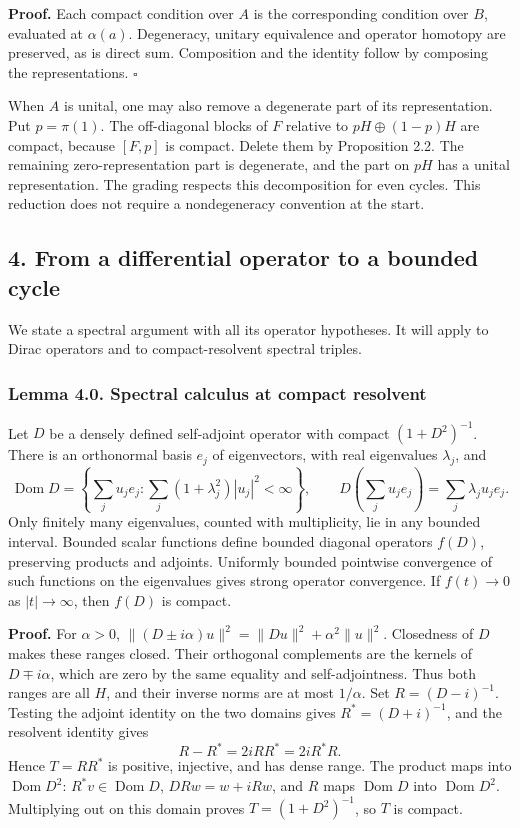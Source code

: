 \documentclass[
  11pt,
]{article}
\begin{document}
\textbf{Proof.} Each compact condition over \(A\) is the corresponding
condition over \(B\), evaluated at \(\alpha(a)\). Degeneracy, unitary
equivalence and operator homotopy are preserved, as is direct sum.
Composition and the identity follow by composing the representations.
\(\square\)

When \(A\) is unital, one may also remove a degenerate part of its
representation. Put \(p=\pi(1)\). The off-diagonal blocks of \(F\)
relative to \(pH\oplus(1-p)H\) are compact, because \([F,p]\) is
compact. Delete them by Proposition 2.2. The remaining
zero-representation part is degenerate, and the part on \(pH\) has a
unital representation. The grading respects this decomposition for even
cycles. This reduction does not require a nondegeneracy convention at
the start.

\subsection{4. From a differential operator to a bounded
cycle}\label{from-a-differential-operator-to-a-bounded-cycle}

We state a spectral argument with all its operator hypotheses. It will
apply to Dirac operators and to compact-resolvent spectral triples.

\subsubsection{Lemma 4.0. Spectral calculus at compact
resolvent}\label{lemma-4.0.-spectral-calculus-at-compact-resolvent}

Let \(D\) be a densely defined self-adjoint operator with compact
\((1+D^2)^{-1}\). There is an orthonormal basis \(e_j\) of eigenvectors,
with real eigenvalues \(\lambda_j\), and \[
\operatorname{Dom}D=\left\{\sum_j u_je_j:\sum_j(1+\lambda_j^2)|u_j|^2<\infty\right\},
\qquad D\left(\sum_j u_je_j\right)=\sum_j\lambda_ju_je_j .
\] Only finitely many eigenvalues, counted with multiplicity, lie in any
bounded interval. Bounded scalar functions define bounded diagonal
operators \(f(D)\), preserving products and adjoints. Uniformly bounded
pointwise convergence of such functions on the eigenvalues gives strong
operator convergence. If \(f(t)\to0\) as \(|t|\to\infty\), then \(f(D)\)
is compact.

\textbf{Proof.} For \(\alpha>0\),
\(\|(D\pm i\alpha)u\|^2=\|Du\|^2+\alpha^2\|u\|^2\). Closedness of \(D\)
makes these ranges closed. Their orthogonal complements are the kernels
of \(D\mp i\alpha\), which are zero by the same equality and
self-adjointness. Thus both ranges are all \(H\), and their inverse
norms are at most \(1/\alpha\). Set \(R=(D-i)^{-1}\). Testing the
adjoint identity on the two domains gives \(R^*=(D+i)^{-1}\), and the
resolvent identity gives \[
R-R^*=2iRR^*=2iR^*R.
\] Hence \(T=RR^*\) is positive, injective, and has dense range. The
product maps into \(\operatorname{Dom}D^2\):
\(R^*v\in\operatorname{Dom}D\), \(DRw=w+iRw\), and \(R\) maps
\(\operatorname{Dom}D\) into \(\operatorname{Dom}D^2\). Multiplying out
on this domain proves \(T=(1+D^2)^{-1}\), so \(T\) is compact.
\end{document}
